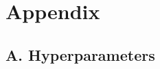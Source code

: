 \documentclass[letterpaper]{article}
\begin{document}


\onecolumn
\appendix
\section*{Appendix}

\subsection*{A. Hyperparameters}
\end{document}
